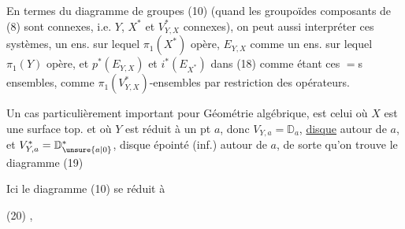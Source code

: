 En termes du diagramme de groupes
(10) (quand les  groupoïdes composants de
(8) sont connexes, i.e. $Y$, $X^*$ et $V^*_{Y,X}$
connexes), on peut aussi interpréter
ces systèmes, 
un ens. sur lequel $\pi_1(X^*)$ opère, $E_{Y,X}$
comme un ens. sur lequel $\pi_1(Y)$ opère,
et $p^*(E_{Y,X})$ et $i^*(E_{X^*})$ dans (18) comme
étant ces $=$s ensembles,  comme
$\pi_1(V^*_{Y,X})$-ensembles  par restriction
des opérateurs.


Un cas  particulièrement important
pour  Géométrie algébrique,
est celui où $X$ est une surface
top. et où $Y$ est réduit à un pt $a$,
donc $V_{Y,a}=\mathbb D_a$, \uline{disque}  autour de $a$,
et $V^*_{Y,a}=\mathbb D^*_{\unsure{a|0}}$, disque épointé (inf.) autour
de $a$, de sorte qu'on trouve le diagramme
\noindent (19)

Ici le diagramme (10) se réduit à

\noindent (20)
,

